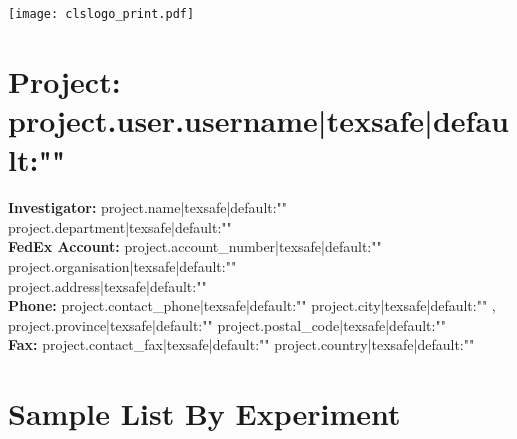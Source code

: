 \documentclass[6pt]{report}
\begin{document}
\hspace{-0.25in}
\texttt{[image: clslogo\_print.pdf]}

\vspace{-0.25in}

\small
\hspace{-0.25in}

\section*{Project: {{ project.user.username|texsafe|default:"" }} }
\begin{center}

{\bf Investigator: }{{ project.name|texsafe|default:"" }} \hfill  {{ project.department|texsafe|default:"" }} \\
{\bf FedEx Account: }{{ project.account_number|texsafe|default:"" }} \hfill {{ project.organisation|texsafe|default:"" }} \\
\hfill {{ project.address|texsafe|default:"" }} \\
{\bf Phone: }{{ project.contact_phone|texsafe|default:"" }} \hfill {{ project.city|texsafe|default:"" }}, {{ project.province|texsafe|default:"" }}   {{ project.postal_code|texsafe|default:"" }} \\
{\bf Fax: }{{ project.contact_fax|texsafe|default:"" }} \hfill {{ project.country|texsafe|default:"" }} \\ 
\end{center}

\section*{Sample List By Experiment}
\end{document}
